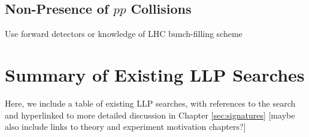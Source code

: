 \subsection{Non-Presence of $pp$ Collisions}

Use forward detectors or knowledge of LHC bunch-filling scheme

\section{Summary of Existing LLP Searches}

Here, we include a table of existing LLP searches, with references to the search and hyperlinked to more detailed discussion in Chapter \ref{sec:signatures} [maybe also include links to theory and experiment motivation chapters?]


